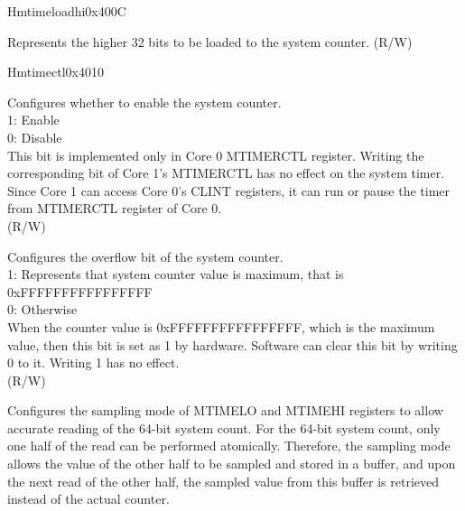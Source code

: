\begin{register}{H}{mtimeloadhi}{0x400C}\label{regdesc:CLINTMTIMELOADHIREG}
%
\regnewline%
\begin{regdesc}
\begin{reglist}
\label{fielddesc:CLINTMTIMELOADHI}\item [MTIME\_LOADHI] Represents the higher 32 bits to be loaded to the system counter. (R/W)
\end{reglist}
\end{regdesc}
\end{register}

\begin{register}{H}{mtimectl}{0x4010}\label{regdesc:CLINTMTIMECTLREG}
%
%
%
%
\regnewline%
\begin{regdesc}
\begin{reglist}
\label{fielddesc:CLINTMTIMECTLEN}\item [MTIME\_EN] Configures whether to enable the system counter. \\
1: Enable\\
0: Disable\\
This bit is implemented only in Core 0 MTIMERCTL register. Writing the corresponding bit of Core 1's MTIMERCTL has no effect on the system timer. Since Core 1 can access Core 0's CLINT registers, it can run or pause the timer from MTIMERCTL register of Core 0. \\
(R/W)
\label{fielddesc:CLINTMTIMECTLOVF}\item [MTIME\_OVF] Configures the overflow bit of the system counter. \\
1: Represents that system counter value is maximum, that is 0xFFFFFFFFFFFFFFFF\\
0: Otherwise\\
When the counter value is 0xFFFFFFFFFFFFFFFF, which is the maximum value, then this bit is set as 1 by hardware. Software can clear this bit by writing 0 to it. Writing 1 has no effect.\\
(R/W)
\label{fielddesc:CLINTMTIMECTLSAM}\item [MTIME\_SAM] Configures the sampling mode of MTIMELO and MTIMEHI registers to allow accurate reading of the 64-bit system count. For the 64-bit system count, only one half of the read can be performed atomically. Therefore, the sampling mode allows the value of the other half to be sampled and stored in a buffer, and upon the next read of the other half, the sampled value from this buffer is retrieved instead of the actual counter. \\

\end{reglist}
\end{regdesc}
\end{register}
